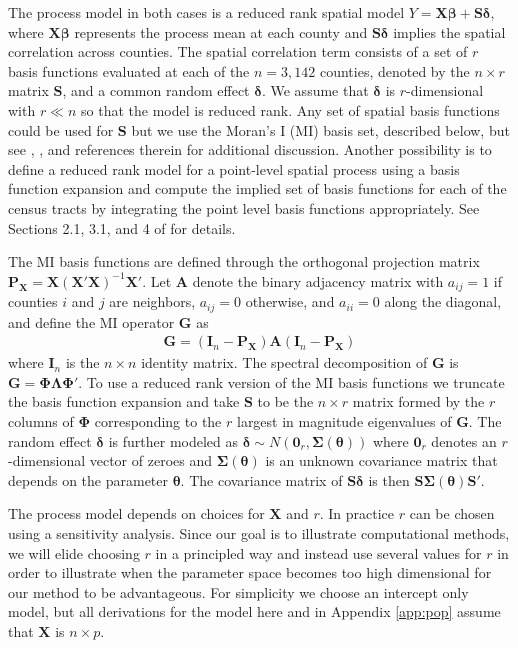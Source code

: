 \documentclass[12pt]{article}
\begin{document}
The process model in both cases is a reduced rank spatial model $Y = \bm{X}\bm{\beta} + \bm{S}\bm{\delta}$, where $\bm{X}\bm{\beta}$ represents the process mean at each county and $\bm{S}\bm{\delta}$ implies the spatial correlation across counties. The spatial correlation term consists of a set of $r$ basis functions evaluated at each of the $n=3,142$ counties, denoted by the $n\times r$ matrix $\bm{S}$, and a common random effect $\bm{\delta}$. We assume that $\bm{\delta}$ is $r$-dimensional with $r \ll n$ so that the model is reduced rank. Any set of spatial basis functions could be used for $\bm{S}$ but we use the Moran's I (MI) basis set, described below, but see \citet{hughes2013dimension}, \citet{porter2015bayesian}, \citet{bradley2015multivariate} and references therein for additional discussion. Another possibility is to define a reduced rank model for a point-level spatial process using a basis function expansion and compute the implied set of basis functions for each of the census tracts by integrating the point level basis functions appropriately. See Sections 2.1, 3.1, and 4 of \citet{bradley2016regionalization} for details.

The MI basis functions are defined through the orthogonal projection matrix $\bm{P}_{\bm{X}} = \bm{X}(\bm{X}'\bm{X})^{-1}\bm{X}'$. Let $\bm{A}$ denote the binary adjacency matrix with $a_{ij} = 1$ if counties $i$ and $j$ are neighbors, $a_{ij}=0$ otherwise, and $a_{ii}=0$ along the diagonal, and define the MI operator $\bm{G}$ as
\begin{align*}
\bm{G} = (\bm{I}_n - \bm{P}_{\bm{X}})\bm{A}(\bm{I}_n - \bm{P}_{\bm{X}})
\end{align*}
where $\bm{I}_n$ is the $n\times n$ identity matrix. The spectral decomposition of $\bm{G}$ is $\bm{G} = \bm{\Phi}\bm{\Lambda}\bm{\Phi}'.$ To use a reduced rank version of the MI basis functions we truncate the basis function expansion and take $\bm{S}$ to be the $n\times r$ matrix formed by the $r$ columns of $\bm{\Phi}$ corresponding to the $r$ largest in magnitude eigenvalues of $\bm{G}$. The random effect $\bm{\delta}$ is further modeled as $\bm{\delta} \sim N(\bm{0}_r,\bm{\Sigma}(\bm{\theta}))$ where $\bm{0}_r$ denotes an $r$-dimensional vector of zeroes and $\bm{\Sigma}(\bm{\theta})$ is an unknown covariance matrix that depends on the parameter $\bm{\theta}$. The covariance matrix of $\bm{S}\bm{\delta}$ is then $\bm{S}\bm{\Sigma}(\bm{\theta})\bm{S}'$.

The process model depends on choices for $\bm{X}$ and $r$. In practice $r$ can be chosen using a sensitivity analysis. Since our goal is to illustrate computational methods, we will elide choosing $r$ in a principled way and instead use several values for $r$ in order to illustrate when the parameter space becomes too high dimensional for our method to be advantageous. For simplicity we choose an intercept only model, but all derivations for the model here and in Appendix \ref{app:pop} assume that $\bm{X}$ is $n\times p$.
\end{document}

